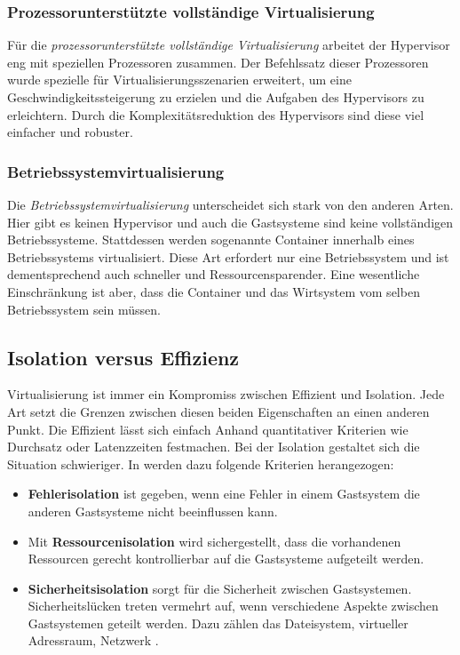 \subsubsection{Prozessorunterstützte vollständige Virtualisierung}

Für die \textit{prozessorunterstützte vollständige Virtualisierung} arbeitet der Hypervisor eng mit speziellen Prozessoren zusammen. Der Befehlssatz dieser Prozessoren wurde spezielle für Virtualisierungsszenarien erweitert, um eine Geschwindigkeitssteigerung zu erzielen und die Aufgaben des Hypervisors zu erleichtern. Durch die Komplexitätsreduktion des Hypervisors sind diese viel einfacher und robuster.

\subsubsection{Betriebssystemvirtualisierung}

Die \textit{Betriebssystemvirtualisierung} unterscheidet sich stark von den anderen Arten. Hier gibt es keinen Hypervisor und auch die Gastsysteme sind keine vollständigen Betriebssysteme. Stattdessen werden sogenannte Container innerhalb eines Betriebssystems virtualisiert. Diese Art erfordert nur eine Betriebssystem und ist dementsprechend auch schneller und Ressourcensparender. Eine wesentliche Einschränkung ist aber, dass die Container und das Wirtsystem vom selben Betriebssystem sein müssen.

\subsection{Isolation versus Effizienz}

Virtualisierung ist immer ein Kompromiss zwischen Effizient und Isolation. Jede Art setzt die Grenzen zwischen diesen beiden Eigenschaften an einen anderen Punkt. Die Effizient lässt sich einfach Anhand quantitativer Kriterien wie Durchsatz oder Latenzzeiten festmachen. Bei der Isolation gestaltet sich die Situation schwieriger. In \cite{Soltesz:2007:COS:1272996.1273025} werden dazu folgende Kriterien herangezogen:

\begin{itemize}
	\item \textbf{Fehlerisolation} ist gegeben, wenn eine Fehler in einem Gastsystem die anderen Gastsysteme nicht beeinflussen kann.
	\item Mit \textbf{Ressourcenisolation} wird sichergestellt, dass die vorhandenen Ressourcen gerecht \bzw kontrollierbar auf die Gastsysteme aufgeteilt werden.
	\item \textbf{Sicherheitsisolation} sorgt für die Sicherheit zwischen Gastsystemen. Sicherheitslücken treten vermehrt auf, wenn verschiedene Aspekte zwischen Gastsystemen geteilt werden. Dazu zählen \zB das Dateisystem, virtueller Adressraum, Netzwerk \usw.
\end{itemize}

